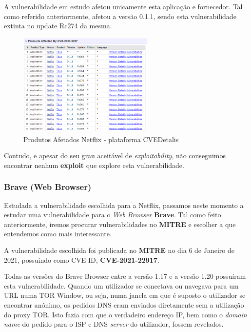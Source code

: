 \documentclass[11t]{article}
\begin{document}
\vspace{0.3cm}

A vulnerabilidade em estudo afetou unicamente esta aplicação e fornecedor. Tal como referido anteriormente, afetou a versão 0.1.1, sendo esta vulnerabilidade extinta no update Rc274 da mesma.

\begin{figure}[H]
    \centering
    \includegraphics[width=0.6\textwidth]{images/produtosAfetadosNetflix.png}
    \caption{Produtos Afetados Netflix - plataforma CVEDetalis}
\end{figure}

Contudo, e apesar do seu grau aceitável de \textit{exploitability}, não conseguimos encontrar nenhum \textbf{exploit} que explore esta vulnerabilidade.


\subsubsection{Brave (Web Browser)}

Estudada a vulnerabilidade escolhida para a Netflix, passamos neste momento a estudar uma vulnerabilidade para o \textit{Web Browser} \textbf{Brave}. Tal como feito anteriormente, iremos procurar vulnerabilidades no \textbf{MITRE} e escolher a que entendemos como mais interessante.

\vspace{0.1cm}

A vulnerabilidade escolhida foi publicada no \textbf{MITRE} no dia 6 de Janeiro de 2021, possuindo como CVE-ID, \textbf{CVE-2021-22917}.

\vspace{0.1cm}

Todas as versões do Brave Browser entre a versão 1.17 e a versão 1.20 possuíram esta vulnerabilidade. Quando um utilizador se conectava ou navegava para um URL numa TOR Window, ou seja, numa janela em que é suposto o utilizador se encontrar anónimo, os pedidos DNS eram enviados diretamente sem a utilização do proxy TOR. Isto fazia com que o verdadeiro endereço IP, bem como o \textit{domain name} do pedido para o ISP e DNS \textit{server} do utilizador, fossem revelados.
\end{document}
